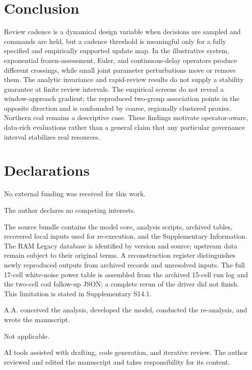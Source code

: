 \section{Conclusion}\label{sec:conclusion}

Review cadence is a dynamical design variable when decisions are sampled and commands are held, but a cadence threshold is meaningful only for a fully specified and empirically supported update map. In the illustrative system, exponential frozen-assessment, Euler, and continuous-delay operators produce different crossings, while small joint parameter perturbations move or remove them. The analytic invariance and rapid-review results do not supply a stability guarantee at finite review intervals. The empirical screens do not reveal a window-approach gradient; the reproduced two-group association points in the opposite direction and is confounded by coarse, regionally clustered proxies. Northern cod remains a descriptive case. These findings motivate operator-aware, data-rich evaluations rather than a general claim that any particular governance interval stabilizes real resources.



\section*{Declarations}
\begin{description}[leftmargin=2.0cm,style=nextline]
\item[Funding] No external funding was received for this work.
\item[Conflicts of interest] The author declares no competing interests.
\item[Data and code availability] The source bundle contains the model core, analysis scripts, archived tables, recovered local inputs used for re-execution, and the Supplementary Information. The RAM Legacy database is identified by version and source; upstream data remain subject to their original terms. A reconstruction register distinguishes newly reproduced outputs from archived records and unresolved inputs. The full 17-cell white-noise power table is assembled from the archived 15-cell run log and the two-cell cod follow-up JSON; a complete rerun of the driver did not finish. This limitation is stated in Supplementary S14.1.
\item[Author contributions] A.A. conceived the analysis, developed the model, conducted the re-analysis, and wrote the manuscript.
\item[Ethics approval] Not applicable.
\item[AI-assisted tools] AI tools assisted with drafting, code generation, and iterative review. The author reviewed and edited the manuscript and takes responsibility for its content.
\end{description}

